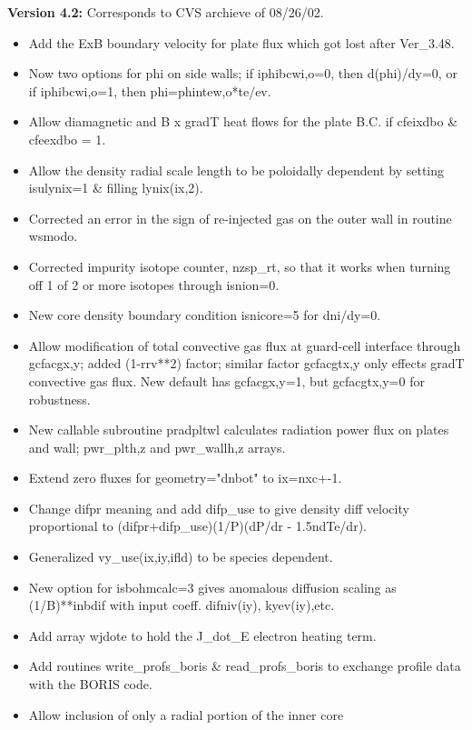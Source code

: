 \documentclass [12pt]{article}
\begin{document}
\noindent\textbf{Version 4.2:} Corresponds to CVS archieve of 08/26/02.
\begin{itemize}
  \item Add the ExB boundary velocity for plate flux which got lost
                  after Ver\_3.48.
  \item Now two options for phi on side walls; if iphibcwi,o=0, then
                  d(phi)/dy=0, or if iphibcwi,o=1, then phi=phintew,o*te/ev.
  \item Allow diamagnetic and B x gradT heat flows for the plate
                  B.C. if cfeixdbo \& cfeexdbo = 1.
  \item Allow the density radial scale length to be poloidally
                  dependent by setting isulynix=1 \& filling lynix(ix,2).
  \item Corrected an error in the sign of re-injected gas on the
          outer wall in routine wsmodo.
  \item Corrected impurity isotope counter, nzsp\_rt, so that it works
          when turning off 1 of 2 or more isotopes through isnion=0.
  \item New core density boundary condition isnicore=5 for dni/dy=0.
  \item Allow modification of total convective gas flux at guard-cell
          interface through gcfacgx,y; added (1-rrv**2) factor; similar
          factor gcfacgtx,y only effects gradT convective gas flux.
          New default has gcfacgx,y=1, but gcfacgtx,y=0 for robustness.
  \item New callable subroutine pradpltwl calculates radiation power
          flux on plates and wall; pwr\_plth,z and pwr\_wallh,z arrays.
  \item Extend zero fluxes for geometry="dnbot" to ix=nxc+-1.
  \item Change difpr meaning and add difp\_use to give density diff
          velocity proportional to (difpr+difp\_use)(1/P)(dP/dr - 1.5ndTe/dr).
  \item Generalized vy\_use(ix,iy,ifld) to be species dependent.
  \item New option for isbohmcalc=3 gives anomalous diffusion scaling
          as (1/B)**inbdif with input coeff. difniv(iy), kyev(iy),etc.
  \item Add array wjdote to hold the J\_dot\_E electron heating term.
  \item Add routines write\_profs\_boris \& read\_profs\_boris to exchange
          profile data with the BORIS code.
  \item Allow inclusion of only a radial portion of the inner core

\end{itemize}
\end{document}
